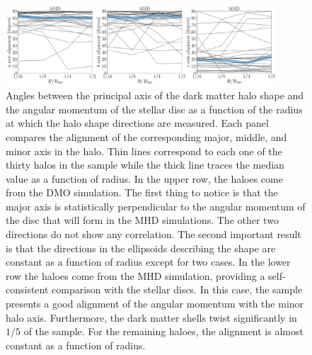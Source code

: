 \documentclass[usenatbib]{mnras}
\begin{document}
\begin{figure}
\begin{center}
\includegraphics[width=0.9\textwidth]{angles_alignment_MHD.pdf}
\end{center}
\caption{Angles between the principal axis of the dark matter halo
  shape and the angular momentum of the stellar disc 
  as a function of the radius at
  which the halo shape directions are measured.
  Each panel compares the alignment of the corresponding
  major, middle, and minor axis in the halo.
  Thin lines correspond to each one of the thirty halos in the sample
  while the thick line traces the median value as a function of  radius.
  In the upper row, the haloes come from the DMO simulation.
  The first thing to notice is that the major axis is statistically
  perpendicular to the angular momentum of the disc that will form in
  the MHD simulations. The other two directions do not show any
  correlation. 
  The second important result is that the directions in the ellipsoids
  describing the shape are constant as a function of radius except for two
  cases. 
  In the lower row the haloes come from the MHD simulation, providing a 
  self-consistent comparison with the stellar discs. 
  In this case, the sample presents a good alignment of the angular
  momentum with the minor halo axis. 
  Furthermore, the dark matter shells twist significantly in $1/5$ of
  the sample. For the remaining haloes, the alignment is almost
  constant as a function of radius. 
}
\label{fig:cumulative_alignment}
\end{figure}
\end{document}
